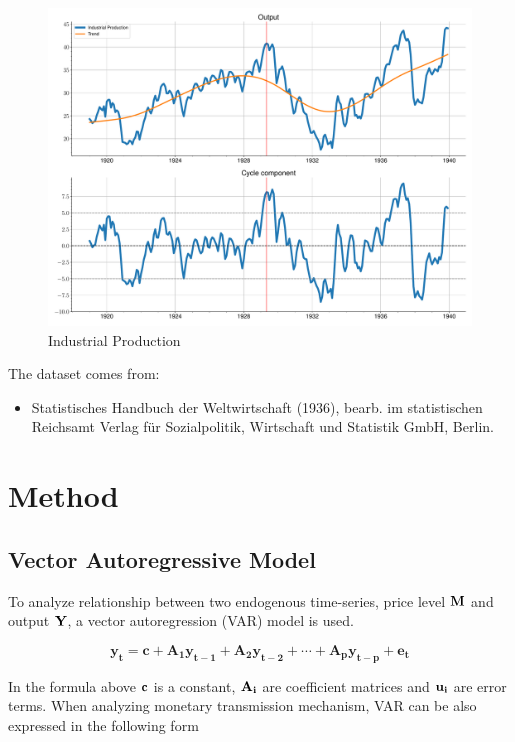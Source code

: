 \documentclass[a4paper,12pt]{article}
\begin{document}
\begin{figure}[t]
    \centering
\caption{Industrial Production}
\label{fig:2}
    \includegraphics[width=\textwidth]{../output/figures/ts_IP.pdf} 
\end{figure}

The dataset comes from:
\begin{itemize}
		\item Statistisches Handbuch der Weltwirtschaft (1936), bearb. im statistischen Reichsamt
Verlag für Sozialpolitik, Wirtschaft und Statistik GmbH, Berlin.
\end{itemize}
 

\section{Method}
\subsection{Vector Autoregressive Model}

To analyze relationship between two endogenous time-series, price level \(\bf M\) and output \(\bf Y\), a vector autoregression (VAR) model is used.

\begin{equation} \label{eq:1}
		{\mathbf{y_{t}=c+A_{1}y_{{t-1}}+A_{2}y_{{t-2}}+\cdots +A_{p}y_{{t-p}}+e_{t}}}
\end{equation}

In the formula above \(\bf c\) is a constant, \(\bf A_i\) are coefficient matrices and \(\bf u_i\) are error terms. When analyzing monetary transmission mechanism, VAR can be also expressed in the following form \citep{favero2001}
\end{document}
